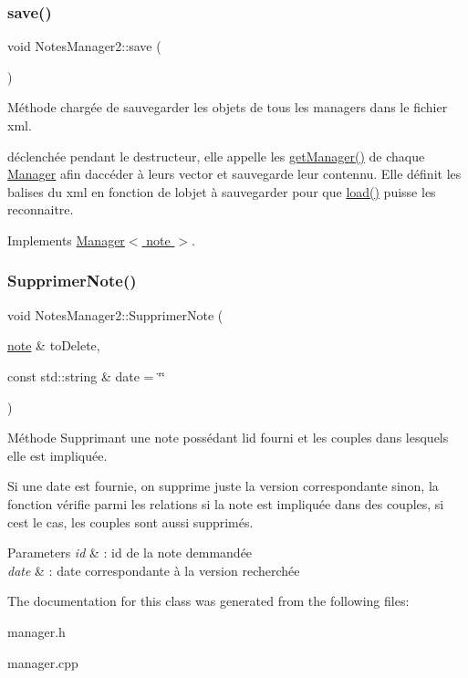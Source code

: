 \subsubsection{\texorpdfstring{save()}{save()}}
{\footnotesize\ttfamily void Notes\+Manager2\+::save (\begin{DoxyParamCaption}{ }\end{DoxyParamCaption})\hspace{0.3cm}{\ttfamily [virtual]}}



Méthode chargée de sauvegarder les objets de tous les managers dans le fichier xml. 

déclenchée pendant le destructeur, elle appelle les \hyperlink{class_notes_manager2_a392bc750d869bacbe50337531213f248}{get\+Manager()} de chaque \hyperlink{class_manager}{Manager} afin d\textquotesingle{}accéder à leurs vector et sauvegarde leur contennu. Elle définit les balises du xml en fonction de l\textquotesingle{}objet à sauvegarder pour que \hyperlink{class_notes_manager2_a2248b5b1620b2039fdba9b3c6476c6cc}{load()} puisse les reconnaitre. 

Implements \hyperlink{class_manager_a952734cfd645e6b257ef19ab06d4ded4}{Manager$<$ note $>$}.

\mbox{\label{class_notes_manager2_ac020f8488f0f71f92de1e8131a64d943}} 
\subsubsection{\texorpdfstring{Supprimer\+Note()}{SupprimerNote()}}
{\footnotesize\ttfamily void Notes\+Manager2\+::\+Supprimer\+Note (\begin{DoxyParamCaption}\item[{\hyperlink{classnote}{note} \&}]{to\+Delete,  }\item[{const std\+::string \&}]{date = {\ttfamily \char`\"{}\char`\"{}} }\end{DoxyParamCaption})}



Méthode Supprimant une note possédant l\textquotesingle{}id fourni et les couples dans lesquels elle est impliquée. 

Si une date est fournie, on supprime juste la version correspondante sinon, la fonction vérifie parmi les relations si la note est impliquée dans des couples, si c\textquotesingle{}est le cas, les couples sont aussi supprimés. 
\begin{DoxyParams}{Parameters}
{\em id} & \+: id de la note demmandée \\
\hline
{\em date} & \+: date correspondante à la version recherchée \\
\hline
\end{DoxyParams}


The documentation for this class was generated from the following files\+:\begin{DoxyCompactItemize}
\item 
manager.\+h\item 
manager.\+cpp\end{DoxyCompactItemize}
